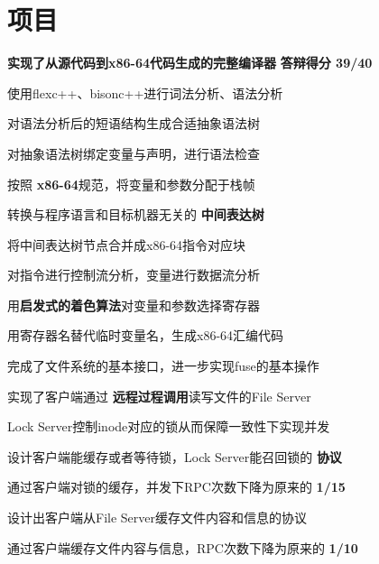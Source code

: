 \documentclass[]{deedy-resume-openfont}
\begin{document}
\begin{minipage}[t]{0.73\textwidth} 


\section{项目}
\sectionsep
{}
\vspace{\topsep}
\begin{tightemize}
    \item \textbf{实现了从源代码到x86-64代码生成的完整编译器} \textbf{答辩得分 39/40}
    \item 使用flexc++、bisonc++进行词法分析、语法分析
    \item 对语法分析后的短语结构生成合适抽象语法树
    \item 对抽象语法树绑定变量与声明，进行语法检查
    \item 按照 \textbf{x86-64}规范，将变量和参数分配于栈帧
    \item 转换与程序语言和目标机器无关的 \textbf{中间表达树}
    \item 将中间表达树节点合并成x86-64指令对应块
    \item 对指令进行控制流分析，变量进行数据流分析
    \item 用\textbf{启发式的着色算法}对变量和参数选择寄存器
    \item 用寄存器名替代临时变量名，生成x86-64汇编代码
\end{tightemize}
\sectionsep
\sectionsep

\begin{tightemize}
\item 完成了文件系统的基本接口，进一步实现fuse的基本操作
\item 实现了客户端通过 \textbf{远程过程调用}读写文件的File Server
\item Lock Server控制inode对应的锁从而保障一致性下实现并发
\item 设计客户端能缓存或者等待锁，Lock Server能召回锁的 \textbf{协议}
\item 通过客户端对锁的缓存，并发下RPC次数下降为原来的 \textbf{1/15}
\item 设计出客户端从File Server缓存文件内容和信息的协议
\item 通过客户端缓存文件内容与信息，RPC次数下降为原来的 \textbf{1/10}
\end{tightemize}
\sectionsep
\sectionsep


\end{minipage}
\end{document}
